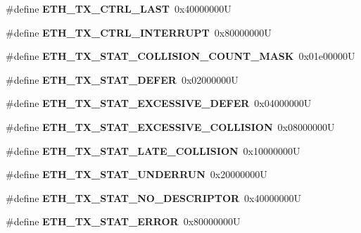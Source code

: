 \begin{DoxyCompactItemize}
\#define {\bfseries E\+T\+H\+\_\+\+T\+X\+\_\+\+C\+T\+R\+L\+\_\+\+L\+A\+ST}~0x40000000U
\item 
\mbox{\label{lpc-ethernet_8c_acf25b1c8e49c2685d06fd3513d8dbe01}} 
\#define {\bfseries E\+T\+H\+\_\+\+T\+X\+\_\+\+C\+T\+R\+L\+\_\+\+I\+N\+T\+E\+R\+R\+U\+PT}~0x80000000U
\item 
\mbox{\label{lpc-ethernet_8c_a1bf570eee2720599195c67299c45be1c}} 
\#define {\bfseries E\+T\+H\+\_\+\+T\+X\+\_\+\+S\+T\+A\+T\+\_\+\+C\+O\+L\+L\+I\+S\+I\+O\+N\+\_\+\+C\+O\+U\+N\+T\+\_\+\+M\+A\+SK}~0x01e00000U
\item 
\mbox{\label{lpc-ethernet_8c_a0a49095281f795029fcc301b0118b5f4}} 
\#define {\bfseries E\+T\+H\+\_\+\+T\+X\+\_\+\+S\+T\+A\+T\+\_\+\+D\+E\+F\+ER}~0x02000000U
\item 
\mbox{\label{lpc-ethernet_8c_a9bb15c929c1f3a394c724ef0cd8c6cbf}} 
\#define {\bfseries E\+T\+H\+\_\+\+T\+X\+\_\+\+S\+T\+A\+T\+\_\+\+E\+X\+C\+E\+S\+S\+I\+V\+E\+\_\+\+D\+E\+F\+ER}~0x04000000U
\item 
\mbox{\label{lpc-ethernet_8c_ac442075e48b95174b45c554061063f98}} 
\#define {\bfseries E\+T\+H\+\_\+\+T\+X\+\_\+\+S\+T\+A\+T\+\_\+\+E\+X\+C\+E\+S\+S\+I\+V\+E\+\_\+\+C\+O\+L\+L\+I\+S\+I\+ON}~0x08000000U
\item 
\mbox{\label{lpc-ethernet_8c_afb06f69f7dcec72fa1784f813ae72939}} 
\#define {\bfseries E\+T\+H\+\_\+\+T\+X\+\_\+\+S\+T\+A\+T\+\_\+\+L\+A\+T\+E\+\_\+\+C\+O\+L\+L\+I\+S\+I\+ON}~0x10000000U
\item 
\mbox{\label{lpc-ethernet_8c_aff1dd2c418281e15364ce0dc55419379}} 
\#define {\bfseries E\+T\+H\+\_\+\+T\+X\+\_\+\+S\+T\+A\+T\+\_\+\+U\+N\+D\+E\+R\+R\+UN}~0x20000000U
\item 
\mbox{\label{lpc-ethernet_8c_a344f0f08557950f3e12a7541b39eb340}} 
\#define {\bfseries E\+T\+H\+\_\+\+T\+X\+\_\+\+S\+T\+A\+T\+\_\+\+N\+O\+\_\+\+D\+E\+S\+C\+R\+I\+P\+T\+OR}~0x40000000U
\item 
\mbox{\label{lpc-ethernet_8c_a6565ebcb2049717481139af61afa1320}} 
\#define {\bfseries E\+T\+H\+\_\+\+T\+X\+\_\+\+S\+T\+A\+T\+\_\+\+E\+R\+R\+OR}~0x80000000U

\end{DoxyCompactItemize}

